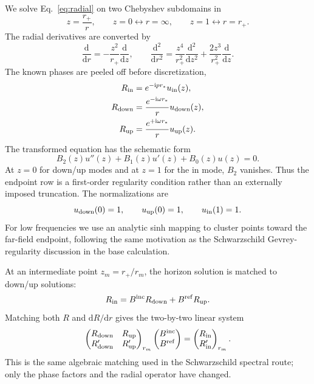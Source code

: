 \documentclass[aps,prd,twocolumn,nofootinbib,superscriptaddress,10pt,floatfix]{revtex4-2}
\newcommand{\ii}{\mathrm{i}}
\newcommand{\dd}{\mathrm{d}}
\newcommand{\rp}{r_+}
\newcommand{\Bin}{B^{\rm inc}}
\newcommand{\Bref}{B^{\rm ref}}
\begin{document}
We solve Eq.~\eqref{eq:radial} on two Chebyshev subdomains in
\begin{equation}
z=\frac{\rp}{r},\qquad z=0\leftrightarrow r=\infty,\qquad
z=1\leftrightarrow r=\rp .
\end{equation}
The radial derivatives are converted by
\begin{equation}
\frac{\dd}{\dd r}=-\frac{z^2}{\rp}\frac{\dd}{\dd z},\qquad
\frac{\dd^2}{\dd r^2}
=\frac{z^4}{\rp^2}\frac{\dd^2}{\dd z^2}
+\frac{2z^3}{\rp^2}\frac{\dd}{\dd z}.
\label{eq:zderivatives}
\end{equation}
The known phases are peeled off before discretization,
\begin{align}
R_{\rm in}&=e^{-\ii p r_*}u_{\rm in}(z),\\
R_{\rm down}&=\frac{e^{-\ii\omega r_*}}{r}u_{\rm down}(z),\\
R_{\rm up}&=\frac{e^{+\ii\omega r_*}}{r}u_{\rm up}(z).
\end{align}
The transformed equation has the schematic form
\begin{equation}
B_2(z)u''(z)+B_1(z)u'(z)+B_0(z)u(z)=0.
\label{eq:transformedu}
\end{equation}
At $z=0$ for down/up modes and at $z=1$ for the in mode, $B_2$ vanishes.
Thus the endpoint row is a first-order regularity condition rather than an
externally imposed truncation.  The normalizations are
\begin{equation}
u_{\rm down}(0)=1,\qquad u_{\rm up}(0)=1,\qquad u_{\rm in}(1)=1.
\end{equation}
For low frequencies we use an analytic sinh mapping to cluster points toward
the far-field endpoint, following the same motivation as the Schwarzschild
Gevrey-regularity discussion in the base calculation.

At an intermediate point $z_m=\rp/r_m$, the horizon solution is matched to
down/up solutions:
\begin{equation}
R_{\rm in}=
\Bin R_{\rm down}+\Bref R_{\rm up}.
\label{eq:match}
\end{equation}
Matching both $R$ and $\dd R/\dd r$ gives the two-by-two linear system
\begin{equation}
\begin{pmatrix}
R_{\rm down} & R_{\rm up}\\
R_{\rm down}' & R_{\rm up}'
\end{pmatrix}_{r_m}
\begin{pmatrix}
\Bin\\
\Bref
\end{pmatrix}
=
\begin{pmatrix}
R_{\rm in}\\
R_{\rm in}'
\end{pmatrix}_{r_m}.
\label{eq:matchsystem}
\end{equation}
This is the same algebraic matching used in the Schwarzschild spectral route;
only the phase factors and the radial operator have changed.
\end{document}

